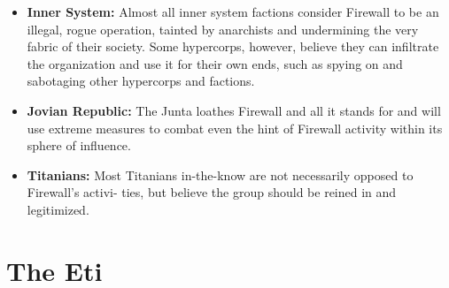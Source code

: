 \begin{itemize}
\item  \textbf{Inner System:} Almost all inner system factions consider Firewall to be an illegal, rogue operation, tainted by anarchists and undermining the very fabric of their society. Some hypercorps, however, believe they can infiltrate the organization and use it for their own ends, such as spying on and sabotaging other hypercorps and factions. 
\item  \textbf{Jovian Republic:} The Junta loathes Firewall and all it stands for and will use extreme measures to combat even the hint of Firewall activity within its sphere of influence.
\item  \textbf{Titanians:} Most Titanians in-the-know are not necessarily opposed to Firewall's activi- ties, but believe the group should be reined in and legitimized. 
\end{itemize}


\section{The Eti }

